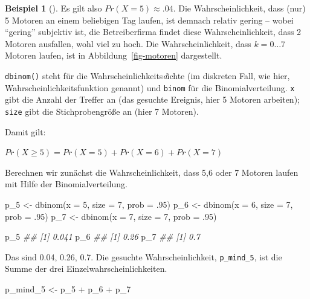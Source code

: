 \documentclass[
  ngerman,
  letterpaper,
  twoside,
  open=any]{scrbook}
\newenvironment{Shaded}{\begin{snugshade}}{\end{snugshade}}
\newcommand{\AttributeTok}[1]{\textcolor[rgb]{0.40,0.45,0.13}{#1}}
\newcommand{\DecValTok}[1]{\textcolor[rgb]{0.68,0.00,0.00}{#1}}
\newcommand{\DocumentationTok}[1]{\textcolor[rgb]{0.37,0.37,0.37}{\textit{#1}}}
\newcommand{\FunctionTok}[1]{\textcolor[rgb]{0.28,0.35,0.67}{#1}}
\newcommand{\NormalTok}[1]{\textcolor[rgb]{0.00,0.23,0.31}{#1}}
\newcommand{\OtherTok}[1]{\textcolor[rgb]{0.00,0.23,0.31}{#1}}
\newcommand{\SpecialCharTok}[1]{\textcolor[rgb]{0.37,0.37,0.37}{#1}}
\theoremstyle{definition}
\newtheorem{example}{Beispiel}[chapter]
\theoremstyle{plain}
\theoremstyle{definition}
\theoremstyle{definition}
\theoremstyle{remark}
\begin{document}
\begin{example}[]
Es gilt also \(Pr(X=5) \approx .04\). Die Wahrscheinlichkeit, dass (nur)
5 Motoren an einem beliebigen Tag laufen, ist demnach relativ gering --
wobei \enquote{gering} subjektiv ist, die Betreiberfirma findet diese
Wahrscheinlichkeit, dass 2 Motoren ausfallen, wohl viel zu hoch. Die
Wahrscheinlichkeit, dass \(k=0 \ldots 7\) Motoren laufen, ist in
Abbildung~\ref{fig-motoren} dargestellt.

\texttt{dbinom()} steht für die Wahrscheinlichkeits\emph{d}ichte (im
diskreten Fall, wie hier, Wahrscheinlichkeitsfunktion genannt) und
\texttt{binom} für die Binomialverteilung. \texttt{x} gibt die Anzahl
der Treffer an (das gesuchte Ereignis, hier 5 Motoren arbeiten);
\texttt{size} gibt die Stichprobengröße an (hier 7 Motoren).

Damit gilt:

\(Pr(X\ge 5) = Pr(X=5) + Pr(X=6) + Pr(X=7)\)

Berechnen wir zunächst die Wahrscheinlichkeit, dass 5,6 oder 7 Motoren
laufen mit Hilfe der Binomialverteilung.

\begin{Shaded}
\begin{Highlighting}[]
\NormalTok{p\_5 }\OtherTok{\textless{}{-}} \FunctionTok{dbinom}\NormalTok{(}\AttributeTok{x =} \DecValTok{5}\NormalTok{, }\AttributeTok{size =} \DecValTok{7}\NormalTok{, }\AttributeTok{prob =}\NormalTok{ .}\DecValTok{95}\NormalTok{)}
\NormalTok{p\_6 }\OtherTok{\textless{}{-}} \FunctionTok{dbinom}\NormalTok{(}\AttributeTok{x =} \DecValTok{6}\NormalTok{, }\AttributeTok{size =} \DecValTok{7}\NormalTok{, }\AttributeTok{prob =}\NormalTok{ .}\DecValTok{95}\NormalTok{)}
\NormalTok{p\_7 }\OtherTok{\textless{}{-}} \FunctionTok{dbinom}\NormalTok{(}\AttributeTok{x =} \DecValTok{7}\NormalTok{, }\AttributeTok{size =} \DecValTok{7}\NormalTok{, }\AttributeTok{prob =}\NormalTok{ .}\DecValTok{95}\NormalTok{)}

\NormalTok{p\_5}
\DocumentationTok{\#\# [1] 0.041}
\NormalTok{p\_6}
\DocumentationTok{\#\# [1] 0.26}
\NormalTok{p\_7}
\DocumentationTok{\#\# [1] 0.7}
\end{Highlighting}
\end{Shaded}

Das sind 0.04, 0.26, 0.7. Die gesuchte Wahrscheinlichkeit,
\texttt{p\_mind\_5}, ist die Summe der drei Einzelwahrscheinlichkeiten.

\begin{Shaded}
\begin{Highlighting}[]
\NormalTok{p\_mind\_5 }\OtherTok{\textless{}{-}}\NormalTok{ p\_5 }\SpecialCharTok{+}\NormalTok{ p\_6 }\SpecialCharTok{+}\NormalTok{ p\_7}


\end{Highlighting}
\end{Shaded}
\end{example}
\end{document}
